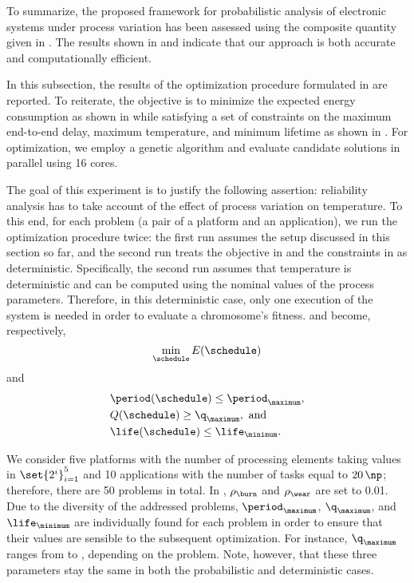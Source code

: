 To summarize, the proposed framework for probabilistic analysis of electronic
systems under process variation has been assessed using the composite quantity
given in . The results shown in
 and  indicate
that our approach is both accurate and computationally efficient.


In this subsection, the results of the optimization procedure formulated in
 are reported. To reiterate, the objective is to
minimize the expected energy consumption as shown in
 while satisfying a set of constraints on the
maximum end-to-end delay, maximum temperature, and minimum lifetime as shown in
. For optimization, we employ a genetic
algorithm and evaluate candidate solutions in parallel using 16 cores.

The goal of this experiment is to justify the following assertion: reliability
analysis has to take account of the effect of process variation on temperature.
To this end, for each problem (a pair of a platform and an application), we run
the optimization procedure twice: the first run assumes the setup discussed in
this section so far, and the second run treats the objective in
 and the constraints in
 as deterministic. Specifically, the second
run assumes that temperature is deterministic and can be computed using the
nominal values of the process parameters. Therefore, in this deterministic case,
only one execution of the system is needed in order to evaluate a chromosome's
fitness.  and
 become, respectively,
\[
    \min_{\schedule} E(\schedule)
\]
and
\begin{align*}
  & \period(\schedule) \leq \period_\maximum, \\
  & Q(\schedule) \geq \q_\maximum, \text{ and} \\
  & \life(\schedule) \leq \life_\minimum.
\end{align*}

We consider five platforms with the number of processing elements \np taking
values in $\set{2^i}_{i = 1}^5$ and 10 applications with the number of tasks \nt
equal to $20 \, \np$; therefore, there are 50 problems in total. In
, $\rho_\burn$ and $\rho_\wear$ are set to
0.01. Due to the diversity of the addressed problems, $\period_\maximum$,
$\q_\maximum$, and $\life_\minimum$ are individually found for each problem in
order to ensure that their values are sensible to the subsequent optimization.
For instance, $\q_\maximum$ ranges from  to , depending
on the problem. Note, however, that these three parameters stay the same in both
the probabilistic and deterministic cases.


